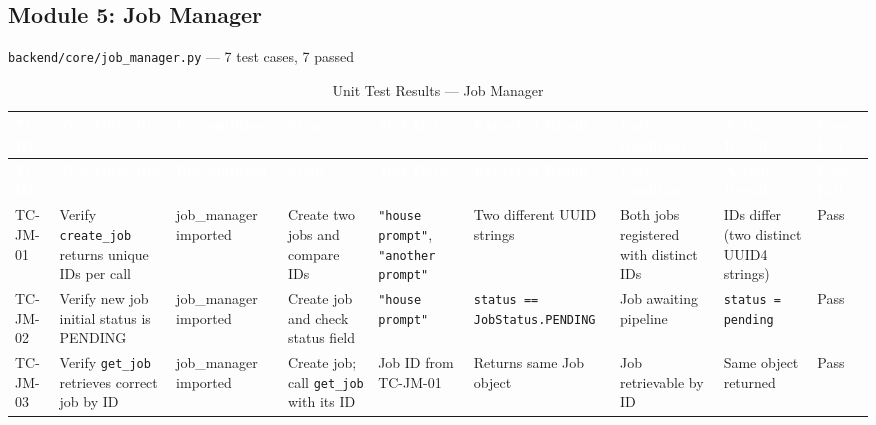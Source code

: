 \subsection{Module 5: Job Manager}
\texttt{backend/core/job\_manager.py} — 7 test cases, 7 passed

\begin{landscape}
\small
\begin{longtable}{|p{1.4cm}|p{3.2cm}|p{2.8cm}|p{2.8cm}|p{2.8cm}|p{2.8cm}|p{2.6cm}|p{2.8cm}|p{1.0cm}|}
\caption{Unit Test Results — Job Manager} \label{tab:jm} \\
\hline
\rowcolor{tableheader}
\textcolor{white}{\textbf{TC ID}} &
\textcolor{white}{\textbf{Test Objective}} &
\textcolor{white}{\textbf{Precondition}} &
\textcolor{white}{\textbf{Steps}} &
\textcolor{white}{\textbf{Test Data}} &
\textcolor{white}{\textbf{Expected Result}} &
\textcolor{white}{\textbf{Post-condition}} &
\textcolor{white}{\textbf{Actual Result}} &
\textcolor{white}{\textbf{Pass/ Fail}} \\
\hline
\endfirsthead
\hline
\rowcolor{tableheader}
\textcolor{white}{\textbf{TC ID}} &
\textcolor{white}{\textbf{Test Objective}} &
\textcolor{white}{\textbf{Precondition}} &
\textcolor{white}{\textbf{Steps}} &
\textcolor{white}{\textbf{Test Data}} &
\textcolor{white}{\textbf{Expected Result}} &
\textcolor{white}{\textbf{Post-condition}} &
\textcolor{white}{\textbf{Actual Result}} &
\textcolor{white}{\textbf{Pass/ Fail}} \\
\hline
\endhead

\rowcolor{passgreen}
TC-JM-01 & Verify \texttt{create\_job} returns unique IDs per call & job\_manager imported & Create two jobs and compare IDs & \texttt{"house prompt"}, \texttt{"another prompt"} & Two different UUID strings & Both jobs registered with distinct IDs & IDs differ (two distinct UUID4 strings) & Pass \\ \hline

\rowcolor{passgreen}
TC-JM-02 & Verify new job initial status is PENDING & job\_manager imported & Create job and check status field & \texttt{"house prompt"} & \texttt{status == JobStatus.PENDING} & Job awaiting pipeline & \texttt{status = pending} & Pass \\ \hline

\rowcolor{passgreen}
TC-JM-03 & Verify \texttt{get\_job} retrieves correct job by ID & job\_manager imported & Create job; call \texttt{get\_job} with its ID & Job ID from TC-JM-01 & Returns same Job object & Job retrievable by ID & Same object returned & Pass \\ \hline


\end{longtable}
\end{landscape}
